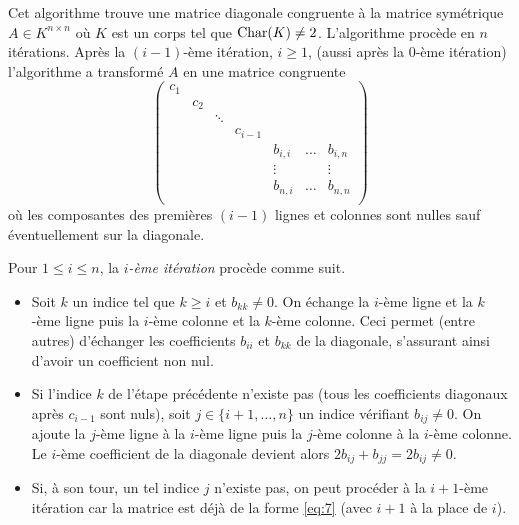 \begin{algorithm}
  \label{alg:1}
  Cet algorithme trouve une matrice diagonale congruente à la matrice symétrique $A \in K^{n \times n}$ où $K$ est un corps tel que $\mathrm{Char}(K) \neq 2$.  L'algorithme procède en $n$ itérations. Après la $(i-1)$-ème itération, $i \geq 1$, (aussi après  la $0$-ème itération) l'algorithme a transformé $A$ en une matrice congruente 
  \begin{equation}
    \label{eq:7}
    \begin{pmatrix}
      c_1 \\
      & c_2 \\
      & & \ddots & &&\\
      & & & c_{i-1} \\
      & & & &  b_{i,i} & \dots & b_{i,n} \\
      & & & &     \vdots       &  & \vdots \\
      & & & &  b_{n,i} & \dots & b_{n,n} \\      
    \end{pmatrix}
  \end{equation}
où les composantes des premières $(i-1)$ lignes et colonnes sont nulles sauf éventuellement sur la diagonale. 

\medskip 
\noindent 
Pour $1 \leq i \leq n$, la \emph{$i$-ème itération} procède comme suit. 
\begin{itemize}
 \item Soit  $k$ un indice tel que $k \geq i$ et $b_{kk} \neq 0$. On échange la $i$-ème ligne et la $k$-ème ligne puis la $i$-ème colonne et la $k$-ème colonne. Ceci permet (entre autres) d'échanger les coefficients $b_{ii}$ et $b_{kk}$ de la diagonale, s'assurant ainsi d'avoir un coefficient non nul. 
 
 \item Si l'indice $k$ de l'étape précédente n'existe pas (tous les coefficients diagonaux après $c_{i-1}$ sont nuls), soit $j \in \{i+1,\dots,n\}$ un indice vérifiant $b_{ij} \neq 0$. On ajoute la $j$-ème ligne à la $i$-ème ligne puis la $j$-ème colonne à la $i$-ème colonne. Le $i$-ème coefficient de la diagonale devient alors $2 b_{ij} + b_{jj} = 2 b_{ij} \neq 0$.
 
 \item Si, à son tour, un tel indice $j$ n'existe pas, on peut procéder à la $i+1$-ème itération car la matrice est déjà de la forme \eqref{eq:7} (avec $i+1$ à la place de $i$).
  

\end{itemize}
\end{algorithm}
